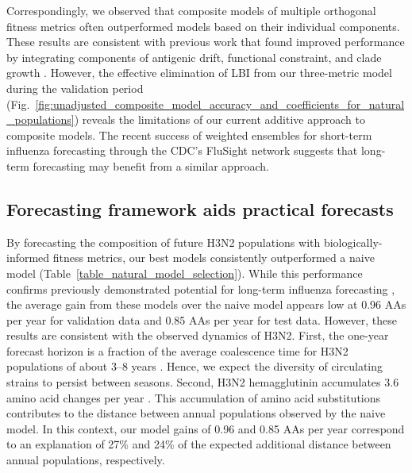 Correspondingly, we observed that composite models of multiple orthogonal fitness metrics often outperformed models based on their individual components.
These results are consistent with previous work that found improved performance by integrating components of antigenic drift, functional constraint, and clade growth \cite{Luksza:2014hj}.
However, the effective elimination of LBI from our three-metric model during the validation period (Fig.~\ref{fig:unadjusted_composite_model_accuracy_and_coefficients_for_natural_populations}) reveals the limitations of our current additive approach to composite models.
The recent success of weighted ensembles for short-term influenza forecasting through the CDC's FluSight network \cite{Reich:2019bq} suggests that long-term forecasting may benefit from a similar approach.

\subsection*{Forecasting framework aids practical forecasts}

By forecasting the composition of future H3N2 populations with biologically-informed fitness metrics, our best models consistently outperformed a naive model (Table~\ref{table_natural_model_selection}).
While this performance confirms previously demonstrated potential for long-term influenza forecasting \cite{Luksza:2014hj}, the average gain from these models over the naive model appears low at 0.96 AAs per year for validation data and 0.85 AAs per year for test data.
However, these results are consistent with the observed dynamics of H3N2.
First, the one-year forecast horizon is a fraction of the average coalescence time for H3N2 populations of about 3--8 years \cite{Rambaut:2008ew}.
Hence, we expect the diversity of circulating strains to persist between seasons.
Second, H3N2 hemagglutinin accumulates 3.6 amino acid changes per year \cite{Smith:2004jc}.
This accumulation of amino acid substitutions contributes to the distance between annual populations observed by the naive model.
In this context, our model gains of 0.96 and 0.85 AAs per year correspond to an explanation of 27\% and 24\% of the expected additional distance between annual populations, respectively.

